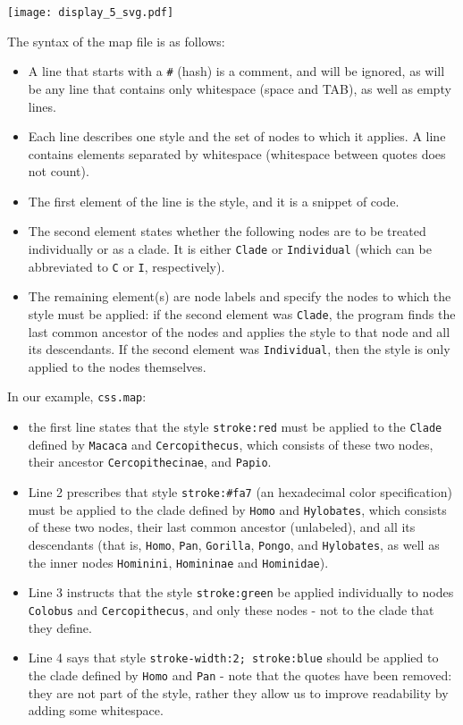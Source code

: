 
\begin{center}
 \texttt{[image: display\_5\_svg.pdf]}
\end{center}

The syntax of the \css{} map file is as follows:
\begin{itemize}
	\item A line that starts with a \texttt{\#} (hash) is a comment, and will be
	ignored, as will be any line that contains only whitespace (space and TAB),
	as well as empty lines.
	\item Each line describes one style and the set of nodes to which it applies.
	A line contains elements separated by whitespace (whitespace between quotes
	does not count). 
	\item The first element of the line is the style, and it is a snippet of
	\css{} code. 
	\item The second element states whether the following nodes are to be treated
	individually or as a clade. It is either \texttt{Clade} or
	\texttt{Individual} (which can be abbreviated to \texttt{C} or \texttt{I},
	respectively).
	\item The remaining element(s) are node labels and specify the nodes to which
	the style must be applied: if the second element was \texttt{Clade}, the
	program finds the last common ancestor of the nodes and applies the style to
	that node and all its descendants. If the second element was
	\texttt{Individual}, then the style is only applied to the nodes themselves.
\end{itemize}

\noindent{}In our example, \texttt{css.map}:
\begin{itemize}
	\item the first line states that the style \texttt{stroke:red} must be applied
		to the \texttt{Clade} defined by \texttt{Macaca} and
		\texttt{Cercopithecus}, which consists of these two nodes, their ancestor
		\texttt{Cercopithecinae}, and \texttt{Papio}. 
	\item Line 2 prescribes that style \texttt{stroke:\#fa7} (an \svg{}
		hexadecimal color specification) must be applied to the clade defined by
		\texttt{Homo} and \texttt{Hylobates}, which consists of these two nodes,
		their last common ancestor (unlabeled), and all its descendants (that is,
		\texttt{Homo}, \texttt{Pan}, \texttt{Gorilla}, \texttt{Pongo}, and
		\texttt{Hylobates}, as well as the inner nodes \texttt{Hominini},
		\texttt{Homininae} and \texttt{Hominidae}). 
	\item Line 3 instructs that the style \texttt{stroke:green} be applied
		individually to nodes \texttt{Colobus} and \texttt{Cercopithecus}, and only
		these nodes - not to the clade that they define.  
	\item Line 4 says that style \texttt{stroke-width:2;~stroke:blue} should be
		applied to the clade defined by \texttt{Homo} and \texttt{Pan} - note that
		the quotes have been removed: they are not part of the style, rather they
		allow us to improve readability by adding some whitespace.
\end{itemize}

